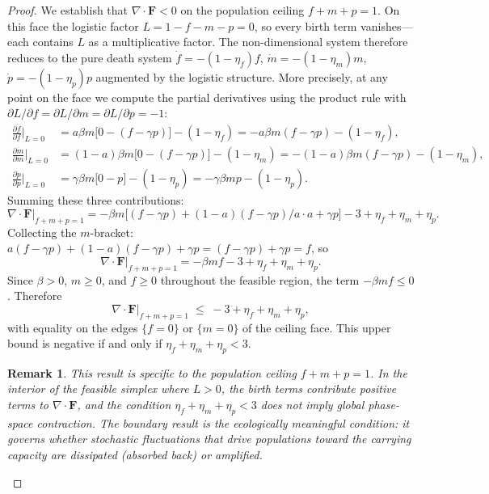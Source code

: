 \documentclass[12pt]{article}
\newtheorem{remark}{Remark}
\begin{document}
\begin{proof}
We establish that $\nabla\cdot\mathbf{F} < 0$ on the population ceiling
$f+m+p=1$.  On this face the logistic factor $L = 1-f-m-p = 0$, so every
birth term vanishes---each contains $L$ as a multiplicative factor.  The
non-dimensional system therefore reduces to the pure death system
$\dot{f}=-(1-\eta_f)f$, $\dot{m}=-(1-\eta_m)m$, $\dot{p}=-(1-\eta_p)p$
augmented by the logistic structure.  More precisely, at any point on the
face we compute the partial derivatives using the product rule with
$\partial L/\partial f = \partial L/\partial m = \partial L/\partial p = -1$:
\begin{align}
  \frac{\partial\dot{f}}{\partial f}\bigg|_{L=0}
    &= a\beta m\bigl[0 - (f-\gamma p)\bigr] - (1-\eta_f)
     = -a\beta m(f-\gamma p) - (1-\eta_f), \\
  \frac{\partial\dot{m}}{\partial m}\bigg|_{L=0}
    &= (1-a)\beta m\bigl[0 - (f-\gamma p)\bigr] - (1-\eta_m)
     = -(1-a)\beta m(f-\gamma p) - (1-\eta_m), \\
  \frac{\partial\dot{p}}{\partial p}\bigg|_{L=0}
    &= \gamma\beta m\bigl[0 - p\bigr] - (1-\eta_p)
     = -\gamma\beta mp - (1-\eta_p).
\end{align}
Summing these three contributions:
\begin{equation}\label{eq:divF_face}
  \nabla\cdot\mathbf{F}\big|_{f+m+p=1}
  = -\beta m\bigl[(f-\gamma p)+(1-a)(f-\gamma p)/a \cdot a + \gamma p\bigr]
    - 3 + \eta_f+\eta_m+\eta_p.
\end{equation}
Collecting the $m$-bracket:
$a(f-\gamma p)+(1-a)(f-\gamma p)+\gamma p = (f-\gamma p)+\gamma p = f$, so
\begin{equation}\label{eq:BetaFactorPoecilia}
  \nabla\cdot\mathbf{F}\big|_{f+m+p=1} = -\beta m f - 3 + \eta_f+\eta_m+\eta_p.
\end{equation}
Since $\beta>0$, $m\ge 0$, and $f\ge 0$ throughout the feasible region, the
term $-\beta mf \le 0$.  Therefore
\begin{equation}
  \nabla\cdot\mathbf{F}\big|_{f+m+p=1}
  \;\le\; -3 + \eta_f+\eta_m+\eta_p,
\end{equation}
with equality on the edges $\{f=0\}$ or $\{m=0\}$ of the ceiling face.
This upper bound is negative if and only if $\eta_f+\eta_m+\eta_p < 3$.

\begin{remark}
This result is specific to the population ceiling $f+m+p=1$.  In the
interior of the feasible simplex where $L>0$, the birth terms contribute
positive terms to $\nabla\cdot\mathbf{F}$, and the condition
$\eta_f+\eta_m+\eta_p<3$ does not imply global phase-space contraction.
The boundary result is the ecologically meaningful condition: it governs
whether stochastic fluctuations that drive populations toward the
carrying capacity are dissipated (absorbed back) or amplified.
\end{remark}
\end{proof}
\end{document}
